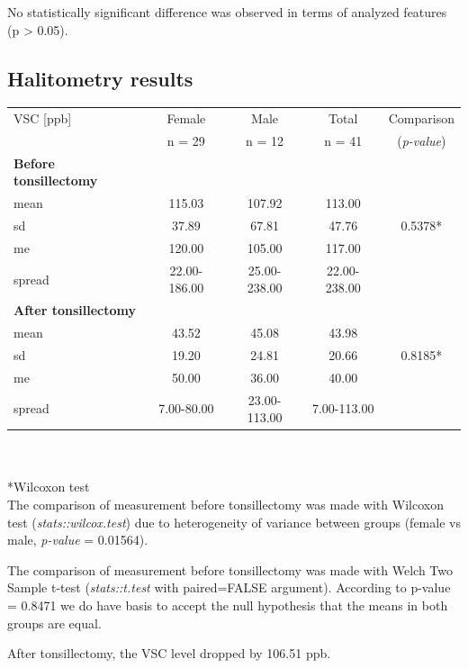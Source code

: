 \documentclass[12pt,a4paper,notitlepage]{report}
\begin{document}
No statistically significant difference was observed in terms of analyzed features (p > 0.05).

\subsection{Halitometry results}
\noindent
\begin{tabular}{lcccc}
\hline VSC [ppb] 				& Female 	& Male 		& Total 		&  Comparison  \\
 		 					& n = 29 	& n = 12	& n = 41	&  (\textit{p-value}) \\
\hline
\bf{Before tonsillectomy}		&			&			&			&		\\
\indent mean					& 115.03	& 107.92	& 113.00	& 		\\
\indent sd					& 37.89		& 67.81		& 47.76		& 0.5378* \\
\indent me					& 120.00	& 105.00	& 117.00	& 		\\
\indent spread				& 22.00-186.00 & 25.00-238.00	& 22.00-238.00	 & \\
\hline

\bf{After tonsillectomy}		&			&			&			&		\\
\indent mean					& 43.52		& 45.08		& 43.98		& 		\\
\indent sd					& 19.20		& 24.81		& 20.66		& 0.8185* \\
\indent me					& 50.00		& 36.00		& 40.00 		& 		\\
\indent spread				& 7.00-80.00 & 23.00-113.00	& 7.00-113.00	 & \\
\hline

\end{tabular} \\ \\

*Wilcoxon test\\

The comparison of measurement before tonsillectomy was made with Wilcoxon test (\textit{stats::wilcox.test}) due to heterogeneity of variance between groups (female vs male, \textit{p-value} = 0.01564). 

The comparison of measurement before tonsillectomy was made with Welch Two Sample t-test (\textit{stats::t.test} with paired=FALSE argument). According to p-value = 0.8471 we do have basis to accept the null hypothesis that the means in both groups are equal. 

After tonsillectomy, the VSC level dropped by 106.51 ppb.
\end{document}
